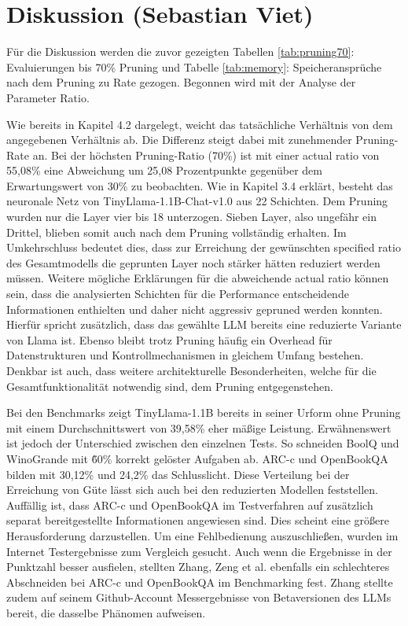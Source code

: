 \section{Diskussion (Sebastian Viet)}

Für die Diskussion werden die zuvor gezeigten Tabellen \ref{tab:pruning70}:
Evaluierungen bis 70\% Pruning und Tabelle \ref{tab:memory}: Speicheransprüche
nach dem Pruning zu Rate gezogen. Begonnen wird mit der Analyse der Parameter
Ratio.

Wie bereits in Kapitel 4.2 dargelegt, weicht das tatsächliche Verhältnis von dem
angegebenen Verhältnis ab. Die Differenz steigt dabei mit zunehmender
Pruning-Rate an. Bei der höchsten Pruning-Ratio (70\%) ist mit einer actual
ratio von 55,08\% eine Abweichung um 25,08 Prozentpunkte gegenüber dem
Erwartungswert von 30\% zu beobachten. Wie in Kapitel 3.4 erklärt, besteht das
neuronale Netz von TinyLlama-1.1B-Chat-v1.0 aus 22 Schichten. Dem Pruning wurden
nur die Layer vier bis 18 unterzogen. Sieben Layer, also ungefähr ein Drittel,
blieben somit auch nach dem Pruning vollständig erhalten. Im Umkehrschluss
bedeutet dies, dass zur Erreichung der gewünschten specified ratio des
Gesamtmodells die geprunten Layer noch stärker hätten reduziert werden müssen.
Weitere mögliche Erklärungen für die abweichende actual ratio können sein, dass
die analysierten Schichten für die Performance entscheidende Informationen
enthielten und daher nicht aggressiv gepruned werden konnten. Hierfür spricht
zusätzlich, dass das gewählte LLM bereits eine reduzierte Variante von Llama
ist. Ebenso bleibt trotz Pruning häufig ein Overhead für Datenstrukturen und
Kontrollmechanismen in gleichem Umfang bestehen. Denkbar ist auch, dass weitere
architekturelle Besonderheiten, welche für die Gesamtfunktionalität notwendig
sind, dem Pruning entgegenstehen.

Bei den Benchmarks zeigt TinyLlama-1.1B bereits in seiner Urform ohne Pruning
mit einem Durchschnittswert von 39,58\% eher mäßige Leistung. Erwähnenswert ist
jedoch der Unterschied zwischen den einzelnen Tests. So schneiden BoolQ und
WinoGrande mit \~ 60\% korrekt gelöster Aufgaben ab. ARC-c und OpenBookQA bilden
mit 30,12\% und 24,2\% das Schlusslicht. Diese Verteilung bei der Erreichung von
Güte lässt sich auch bei den reduzierten Modellen feststellen. Auffällig ist,
dass ARC-c und OpenBookQA im Testverfahren auf zusätzlich separat
bereitgestellte Informationen angewiesen sind. Dies scheint eine größere
Herausforderung darzustellen. Um eine Fehlbedienung auszuschließen, wurden im
Internet Testergebnisse zum Vergleich gesucht. Auch wenn die Ergebnisse in der
Punktzahl besser ausfielen, stellten Zhang, Zeng et al. ebenfalls ein
schlechteres Abschneiden bei ARC-c und OpenBookQA im Benchmarking
fest.\autocite[Vgl.][S. 6]{zhang2024tinyllama} Zhang stellte zudem auf seinem
Github-Account Messergebnisse von Betaversionen des LLMs bereit, die dasselbe
Phänomen aufweisen.\autocite[Vgl.][]{zhang2023eval}

